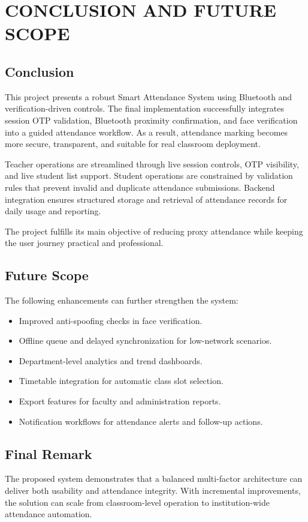 \chapter{CONCLUSION AND FUTURE SCOPE} \label{c7}
\section{Conclusion}
This project presents a robust Smart Attendance System using Bluetooth and verification-driven controls. The final implementation successfully integrates session OTP validation, Bluetooth proximity confirmation, and face verification into a guided attendance workflow. As a result, attendance marking becomes more secure, transparent, and suitable for real classroom deployment.

Teacher operations are streamlined through live session controls, OTP visibility, and live student list support. Student operations are constrained by validation rules that prevent invalid and duplicate attendance submissions. Backend integration ensures structured storage and retrieval of attendance records for daily usage and reporting.

The project fulfills its main objective of reducing proxy attendance while keeping the user journey practical and professional.

\section{Future Scope}
The following enhancements can further strengthen the system:
\begin{itemize}
\item Improved anti-spoofing checks in face verification.
\item Offline queue and delayed synchronization for low-network scenarios.
\item Department-level analytics and trend dashboards.
\item Timetable integration for automatic class slot selection.
\item Export features for faculty and administration reports.
\item Notification workflows for attendance alerts and follow-up actions.
\end{itemize}

\section{Final Remark}
The proposed system demonstrates that a balanced multi-factor architecture can deliver both usability and attendance integrity. With incremental improvements, the solution can scale from classroom-level operation to institution-wide attendance automation.

